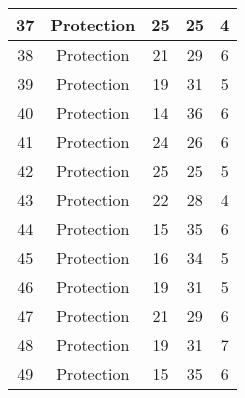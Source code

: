 \documentclass[results.tex]{subfiles}
\begin{document}
\begin{center}
\begin{tabular}{| c || c | c | c | c |}
            \hline
            37                      & Protection                   & 25                     & 25                      & 4                    \\
            \hline
            38                      & Protection                   & 21                     & 29                      & 6                    \\
            \hline
            39                      & Protection                   & 19                     & 31                      & 5                    \\
            \hline
            40                      & Protection                   & 14                     & 36                      & 6                    \\
            \hline
            41                      & Protection                   & 24                     & 26                      & 6                    \\
            \hline
            42                      & Protection                   & 25                     & 25                      & 5                    \\
            \hline
            43                      & Protection                   & 22                     & 28                      & 4                    \\
            \hline
            44                      & Protection                   & 15                     & 35                      & 6                    \\
            \hline
            45                      & Protection                   & 16                     & 34                      & 5                    \\
            \hline
            46                      & Protection                   & 19                     & 31                      & 5                    \\
            \hline
            47                      & Protection                   & 21                     & 29                      & 6                    \\
            \hline
            48                      & Protection                   & 19                     & 31                      & 7                    \\
            \hline
            49                      & Protection                   & 15                     & 35                      & 6                    \\
            \hline
        \end{tabular}
    \end{center}
\end{document}
